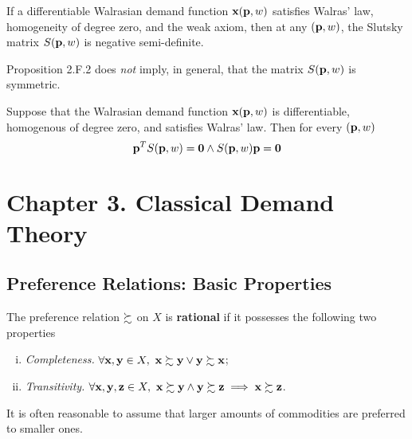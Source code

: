 \documentclass{article}
\begin{document}
 			\begin{proposition}[2.F.2]
 				If a differentiable Walrasian demand function $\textbf{x}(\textbf{p}, w)$ satisfies Walras' law, homogeneity of degree zero, and the weak axiom, then at any $(\textbf{p}, w)$, the Slutsky matrix $S(\textbf{p}, w)$ is negative semi-definite.
 			\end{proposition}
 			
 			\begin{remark}
 				Proposition 2.F.2 does \emph{not} imply, in general, that the matrix $S(\textbf{p}, w)$ is symmetric.
 			\end{remark}
 			
 			\begin{proposition}[2.F.3]
 				Suppose that the Walrasian demand function $\textbf{x}(\textbf{p}, w)$ is differentiable, homogenous of degree zero, and satisfies Walras' law. Then for every $(\textbf{p}, w)$
 				\begin{equation}
 					\textbf{p}^T S(\textbf{p}, w) = \textbf{0} \land S(\textbf{p}, w) \textbf{p} = \textbf{0}
 				\end{equation}
 			\end{proposition}
 	
 	\section{Chapter 3. Classical Demand Theory}
 		\subsection{Preference Relations: Basic Properties}
 			\begin{definition}[3.B.1]
 				The preference relation $\succsim$ on $X$ is \textbf{rational} if it possesses the following two properties
 				\begin{enumerate}[(i)]
 					\item \emph{Completeness.} $\forall \textbf{x}, \textbf{y} \in X,\ \textbf{x} \succsim \textbf{y} \lor \textbf{y} \succsim \textbf{x}$;
 					\item \emph{Transitivity.} $\forall \textbf{x}, \textbf{y}, \textbf{z} \in X,\ \textbf{x} \succsim \textbf{y} \land \textbf{y} \succsim \textbf{z} \implies \textbf{x} \succsim \textbf{z}$.
 				\end{enumerate}
 			\end{definition}
 			
 			\begin{remark}
 				It is often reasonable to assume that larger amounts of commodities are preferred to smaller ones.
 			\end{remark}
 			
\end{document}
